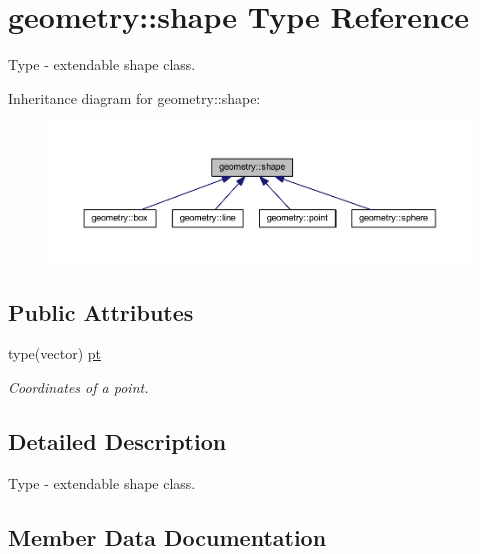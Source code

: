 \hypertarget{structgeometry_1_1shape}{}\section{geometry\+:\+:shape Type Reference}
\label{structgeometry_1_1shape}


Type -\/ extendable shape class.  




Inheritance diagram for geometry\+:\+:shape\+:\nopagebreak
\begin{figure}[H]
\begin{center}
\leavevmode
\includegraphics[width=350pt]{structgeometry_1_1shape__inherit__graph}
\end{center}
\end{figure}
\subsection*{Public Attributes}
\begin{DoxyCompactItemize}
\item 
type(vector) \mbox{\hyperlink{structgeometry_1_1shape_aada595aa3503cf22350737caf2931e6a}{pt}}
\begin{DoxyCompactList}\small\item\em Coordinates of a point. \end{DoxyCompactList}\end{DoxyCompactItemize}


\subsection{Detailed Description}
Type -\/ extendable shape class. 

\subsection{Member Data Documentation}
\mbox{\label{structgeometry_1_1shape_aada595aa3503cf22350737caf2931e6a}} 
